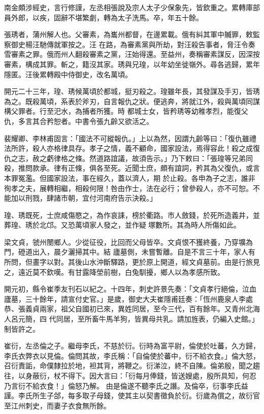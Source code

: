 \begin{pinyinscope}
 南金頗涉經史，言行修謹，左丞相張說及宗人太子少保象先，皆欽重之。累轉庫部員外郎，以疾，固辭不堪繁劇，轉為太子洗馬。卒，年五十餘。



 張琇者，蒲州解人也。父審素，為巂州都督，在邊累載。俄有糾其軍中贓罪，敕監察御史楊汪馳傳就軍按之。汪
 在路，為審素黨與所劫，對汪殺告事者，脅汪令奏雪審素之罪。俄而州人翻殺審素之黨，汪始得還。至益州，奏稱審素謀反，因深按審素，構成其罪。斬之，籍沒其家。琇與兄瑝，以年幼坐徙嶺外。尋各逃歸，累年隱匿。汪後累轉殿中侍御史，改名萬頃。



 開元二十三年，瑝、琇候萬頃於都城，挺刃殺之。瑝雖年長，其發謀及手刃，皆琇為之。既殺萬頃，系表於斧刃，自言報仇之狀。便逃奔，將就江外，殺與萬頃同謀構父罪者。行至汜水，為捕者所獲。時
 都城士女，皆矜琇等幼稚孝烈，能復父仇，多言其合矜恕者。中書令張九齡又欲活之。



 裴耀卿、李林甫固言：「國法不可縱報仇。」上以為然，因謂九齡等曰：「復仇雖禮法所許，殺人亦格律具存。孝子之情，義不顧命，國家設法，焉得容此！殺之成復仇之志，赦之虧律格之條。然道路誼議，故須告示。」乃下敕曰：「張瑝等兄弟同殺，推問款承。律有正條，俱各至死。近聞士庶，頗有誼詞，矜其為父復仇，或言本罪冤濫。但國家設法，事在經久，蓋以濟人，期
 於止殺。各申為子之志，誰非徇孝之夫，展轉相繼，相殺何限！咎由作士，法在必行；曾參殺人，亦不可恕。不能加以刑戮，肆諸市朝，宜付河南府告示決殺。」



 瑝、琇既死，士庶咸傷愍之，為作哀誄，榜於衢路。市人斂錢，於死所造義井，並葬瑝、琇於北邙。又恐萬頃家人發之，並作疑塚數所。其為時人所傷如此。



 梁文貞，虢州閿鄉人。少從征役，比回而父母皆卒。文貞恨不獲終養，乃穿壙為門，磴道出入，晨夕灑掃其中。結
 廬墓側，未嘗暫離。自是不言三十年，家人有所問，但畫字以對。其後山水沖斷驛路，更於原上開道，經文貞墓前。由是行旅見之，遠近莫不欽嘆。有甘露降塋前樹，白兔馴擾，鄉人以為孝感所致。



 開元初，縣令崔季友刊石以紀之。十四年，刺史許景先奏：「文貞孝行絕倫，泣血廬墓，三十餘年，請宣付史官。」是歲，御史大夫崔隱甫廷奏：「恆州鹿泉人李處恭、張義貞兩家，祖父自國初已來，異姓同居，至今三代，百有餘年。又青州北海人呂元簡，四
 代同居，至所畜牛馬羊狗，皆異母共乳。請加旌表，仍編入史館。」制皆許之。



 崔衍，左丞倫之子。繼母李氏，不慈於衍。衍時為富平尉，倫使於吐蕃，久方歸，李氏衣弊衣以見倫。倫問其故，李氏稱：「自倫使於蕃中，衍不給衣食。」倫大怒，召衍責詬，命僕隸拉於地，袒其背，將鞭之。衍涕泣，終不自陳。倫弟殷，聞之趨往，以身蔽衍，杖不得下。因大言曰：「衍每月俸錢，皆送嫂處，殷所具知，何忍乃言衍不給衣食！」倫怒乃解。
 由是倫遂不聽李氏之譖。及倫卒，衍事李氏益謹。李氏所生子郃，每多取子母錢，使其主以契書徵負於衍。衍歲為償之，故衍官至江州刺史，而妻子衣食無所餘。




\end{pinyinscope}
